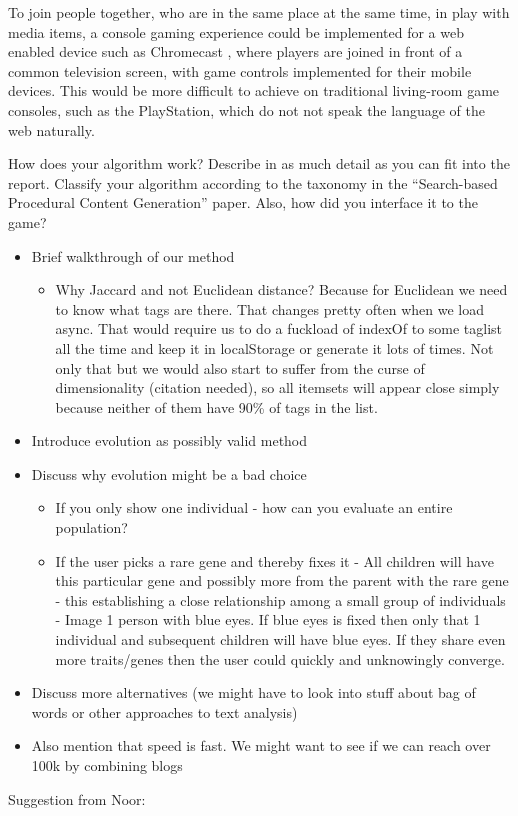 \documentclass[]{article}
\begin{document}
To join people together, who are in the same place at the same time, in play with media items, a console gaming experience could be implemented for a web enabled device such as Chromecast \cite{ChromecastGames}, where players are joined in front of a common television screen, with game controls implemented for their mobile devices.  This would be more difficult to achieve on traditional living-room game consoles, such as the PlayStation, which do not not speak the language of the web naturally.



\begin{framed}
How does your algorithm work? Describe in as much detail as you can fit into the report. Classify your algorithm according to the taxonomy in the “Search-based Procedural Content Generation” paper. Also, how did you interface it to the game?
\end{framed}



\begin{itemize}
\item Brief walkthrough of our method
	\begin{itemize}
	\item Why Jaccard and not Euclidean distance? Because for Euclidean we need to know what tags are there. That changes pretty often when we load async. That would require us to do a fuckload of indexOf to some taglist all the time and keep it in localStorage or generate it lots of times. Not only that but we would also start to suffer from the curse of dimensionality (citation needed), so all itemsets will appear close simply because neither of them have 90\% of tags in the list.
	\end{itemize}
\item Introduce evolution as possibly valid method
\item Discuss why evolution might be a bad choice
	\begin{itemize}
	\item If you only show one individual - how can you evaluate an entire population?
	\item If the user picks a rare gene and thereby fixes it - All children will have this particular gene and possibly more from the parent with the rare gene - this establishing a close relationship among a small group of individuals - Image 1 person with blue eyes. If blue eyes is fixed then only that 1 individual and subsequent children will have blue eyes. If they share even more traits/genes then the user could quickly and unknowingly converge.
	\end{itemize}
\item Discuss more alternatives (we might have to look into stuff about bag of words or other approaches to text analysis)
\item Also mention that speed is fast. We might want to see if we can reach over 100k by combining blogs
\end{itemize}
Suggestion from Noor:
\end{document}
